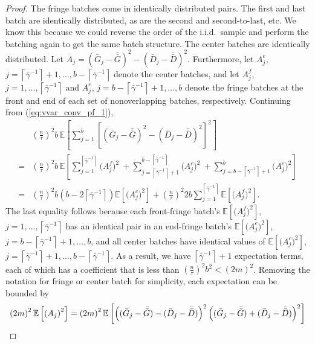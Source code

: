 \documentclass[12pt]{article}
\newcommand{\e}[1]{\mathbb{E} \left[ #1 \right]
}
\newcommand{\gammab}{\bar{\gamma}}
\newcommand{\gb}{\bar{G}}
\newcommand{\gbb}{\bar{\gb}}
\newcommand{\db}{\bar{D}}
\newcommand{\dbb}{\bar{\db}}
\begin{document}
\begin{proof}
	The fringe batches come in identically distributed pairs.  
        The first and last batch are identically distributed, as are the second and second-to-last, etc.  
        We know this because we could reverse the order of the i.i.d.\ sample and perform the batching again to get the same batch structure.  
		  The center batches are identically distributed.  
        Let $A_j = (\gb_j - \gbb)^2 - (\db_j - \dbb)^2$.
		  Furthermore, let $A_j^c$, $j=\left\lceil \gammab^{-1} \right\rceil+1, \ldots, b - \left\lceil \gammab^{-1} \right\rceil$ denote the center batches, and let $A_j^f$, $j=1,\ldots,\left\lceil \gammab^{-1} \right\rceil$ and $A_j^e$, $j=b - \left\lceil \gammab^{-1} \right\rceil+1,\ldots,b$ denote the fringe batches at the front and end of each set of nonoverlapping batches, respectively.  
		  Continuing from (\ref{eq:vvar_conv_pf_1}),
	\begin{align*}
		& \left( \frac{n}{\tau} \right)^2 b \, \e{ \sum_{j=1}^{b} \left[ (\gb_j - \gbb)^2 - (\db_j - \dbb)^2 \right]^2 } \\
		 =  & \left( \frac{n}{\tau} \right)^2 b \, \e{\sum_{j=1}^{\left\lceil \gammab^{-1} \right\rceil} \big( A_j^f \big)^2 \
		 + \sum_{j=\left\lceil \gammab^{-1} \right\rceil+1}^{b-\left\lceil \gammab^{-1} \right\rceil} \big( A_j^c \big)^2 \
		 + \sum_{j=b-\left\lceil \gammab^{-1} \right\rceil+1}^{b} \big( A_j^e \big)^2 
		} \\
		 = & \left( \frac{n}{\tau} \right)^2 b \left(b - 2\left\lceil \gammab^{-1} \right\rceil \right) \e{ \big( A_j^c \big)^2 }
		+ \left( \frac{n}{\tau} \right)^2  2 b \sum_{j=1}^{\left\lceil \gammab^{-1} \right\rceil} \e{ \big( A_j^f \big)^2 }.
	\end{align*}	
	The last equality follows because each front-fringe batch's $\e{\big(A_j^f\big)^2}$, $j=1,\ldots,\left\lceil \gammab^{-1} \right\rceil$  has an identical pair in an end-fringe batch's $\e{\big(A_j^e\big)^2}$, $j=b - \left\lceil \gammab^{-1} \right\rceil+1,\ldots,b$, and all center batches have identical values of $\e{\big(A_j^c\big)^2}$, $j=\left\lceil \gammab^{-1} \right\rceil+1, \ldots, b - \left\lceil \gammab^{-1} \right\rceil$.  
	As a result, we have $\left\lceil \gammab^{-1} \right\rceil + 1$ expectation terms, each of which has a coefficient that is less than $\left(\frac{n}{\tau}\right)^2b^2 < (2m)^2$.  
        Removing the notation for fringe or center batch for simplicity, each expectation can be bounded by
	\begin{align}
		\left( 2m \right)^2 \e{ \left( A_j \right)^2 } & = \left( 2m \right)^2 \e{ \left((\gb_j - \gbb) - (\db_j - \dbb)\right)^2 \left((\gb_j - \gbb) + (\db_j - \dbb)\right)^2 } \notag \\

\end{align}
\end{proof}
\end{document}
